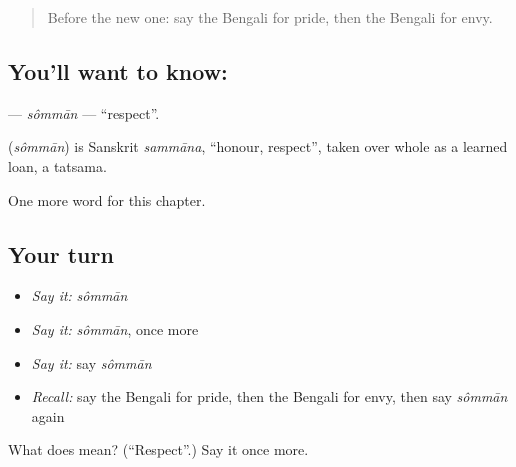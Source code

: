 \begin{quote}
Before the new one: say the Bengali for pride, then the Bengali for envy.
\end{quote}

\subsection*{You'll want to know: }
\textbf{} — \emph{sômmān} — \textquotedblleft{}respect\textquotedblright{}.

\begin{cousinweb}
\textbf{} (\emph{sômmān}) is Sanskrit \emph{sammāna}, \textquotedblleft{}honour, respect\textquotedblright{}, taken over whole as a learned loan, a tatsama.
\end{cousinweb}

\begin{grammarlens}[title={What you've built}]
One more word for this chapter.
\end{grammarlens}

\subsection*{Your turn}
\begin{itemize}
\raggedright
  \item \emph{Say it:} \emph{sômmān}
  \item \emph{Say it:} \emph{sômmān}, once more
  \item \emph{Say it:} say \emph{sômmān}
  \item \emph{Recall:} say the Bengali for pride, then the Bengali for envy, then say \emph{sômmān} again
\end{itemize}

\begin{tcolorbox}[breakable,colback=teal!4,colframe=teal!35!black,title={Before you move on}]
What does  mean? (\textquotedblleft{}Respect\textquotedblright{}.) Say it once more.
\end{tcolorbox}
